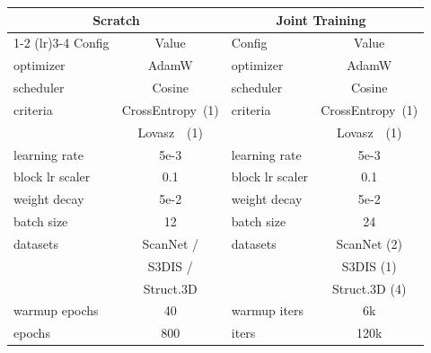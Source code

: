 \begin{tabular}{lclc}\toprule
\multicolumn{2}{c}{Scratch} &\multicolumn{2}{c}{Joint Training~\cite{wu2023ppt}} \\
\cmidrule(lr){1-2} \cmidrule(lr){3-4}
Config &Value &Config &Value \\\midrule
optimizer &AdamW &optimizer &AdamW \\
scheduler &Cosine &scheduler &Cosine \\
criteria &CrossEntropy~(1) &criteria &CrossEntropy~(1) \\
&Lovasz~\cite{berman2018lovasz}~(1) & &Lovasz~\cite{berman2018lovasz}~(1) \\
learning rate &5e-3 &learning rate &5e-3 \\
block lr scaler &0.1 &block lr scaler &0.1 \\
weight decay &5e-2 &weight decay &5e-2 \\
batch size &12 &batch size &24 \\
datasets &ScanNet / &datasets &ScanNet (2) \\
&S3DIS / & &S3DIS (1) \\
&Struct.3D & &Struct.3D (4) \\
warmup epochs &40 &warmup iters &6k \\
epochs &800 &iters &120k \\
\bottomrule
\end{tabular}
